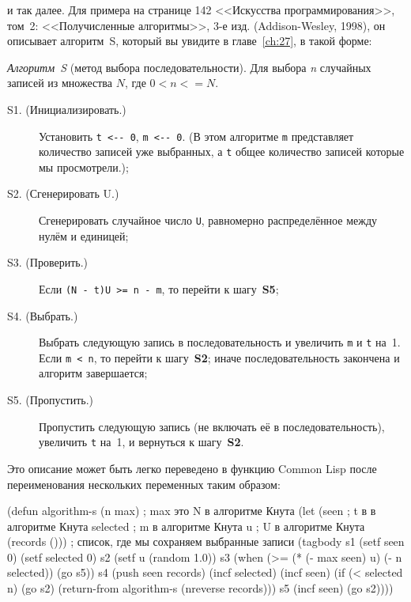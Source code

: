 \noindent{}и так далее. Для примера на странице 142 <<Искусства программирования>>, том~2:
<<Получисленные алгоритмы>>, 3-е изд. (Addison-Wesley, 1998), он описывает алгоритм~S,
который вы увидите в главе~\ref{ch:27}, в такой форме:

\textit{Алгоритм~S} (метод выбора последовательности). Для выбора \textit{n} случайных записей из
множества $N$, где $0 < n <= N$.

\begin{description}
\item[S1. (Инициализировать.)] Установить \lstinline!t <-- 0!, \lstinline!m <-- 0!. (В
  этом алгоритме \lstinline!m! представляет количество записей уже выбранных, а \lstinline!t! общее
  количество записей которые мы просмотрели.);

\item[S2. (Сгенерировать U.)]  Сгенерировать случайное число \lstinline!U!, равномерно
  распределённое между нулём и единицей;

\item[S3. (Проверить.)] Если \lstinline!(N - t)U >= n - m!, то перейти к шагу~\textbf{S5};

\item[S4. (Выбрать.)] Выбрать следующую запись в последовательность и увеличить
\lstinline!m! и \lstinline!t! на~1. Если \lstinline!m < n!, то перейти к шагу~\textbf{S2}; иначе 
последовательность закончена и алгоритм завершается;

\item[S5. (Пропустить.)] Пропустить следующую запись (не включать её в 
последовательность), увеличить \lstinline!t! на~1, и вернуться к шагу~\textbf{S2}.

\end{description}

Это описание может быть легко переведено в  функцию Common Lisp после переименования
нескольких переменных таким образом:

\begin{myverb}
(defun algorithm-s (n max) ; max это N в алгоритме Кнута
  (let (seen               ; t в в алгоритме Кнута
        selected           ; m в алгоритме Кнута
        u                  ; U в алгоритме Кнута
        (records ()))      ; список, где мы сохраняем выбранные записи
    (tagbody
     s1
       (setf seen 0)
       (setf selected 0)
     s2
       (setf u (random 1.0))
     s3
       (when (>= (* (- max seen) u) (- n selected)) (go s5))
     s4
       (push seen records)
       (incf selected)
       (incf seen)
       (if (< selected n)
           (go s2)
           (return-from algorithm-s (nreverse records)))
     s5
       (incf seen)
       (go s2))))
\end{myverb}

